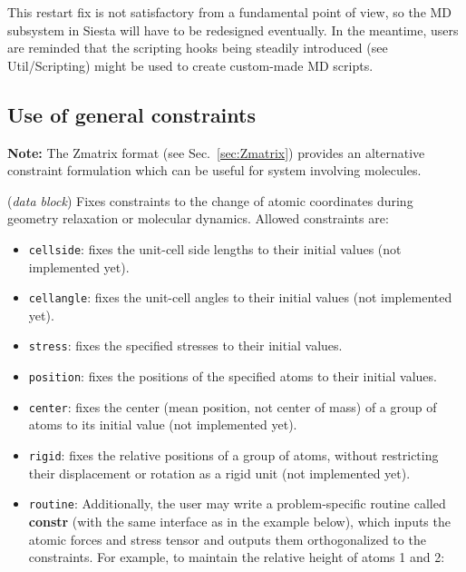 \documentclass[11pt]{article}
\begin{document}
This restart fix is not satisfactory from a fundamental point of view,
so the MD subsystem in Siesta will have to be redesigned
eventually. In the meantime, users are reminded that the scripting
hooks being steadily introduced (see Util/Scripting) might be used to
create custom-made MD scripts.


\subsection{Use of general constraints}

{\bf Note:} The Zmatrix format (see Sec.~\ref{sec:Zmatrix}) provides
an alternative constraint formulation which can be useful for system
involving molecules.

\begin{description}
\itemsep 10pt
\parsep 0pt

\item[{\bf GeometryConstraints}] ({\it data block})
Fixes constraints to the change of atomic coordinates during
geometry relaxation or molecular dynamics. Allowed constraints are:
\begin{itemize}
\item {\tt cellside}: fixes the unit-cell side lengths to
their initial values (not implemented yet).
\item {\tt cellangle}: fixes the unit-cell angles to
their initial values (not implemented yet).
\item {\tt stress}: fixes the specified stresses to
their initial values.
\item {\tt position}: fixes the positions of the specified atoms to
their initial values.
\item {\tt center}: fixes the center (mean position, not center of
mass) of a group of atoms to its initial value (not implemented yet).
\item {\tt rigid}: fixes the relative positions of a group of atoms,
without restricting their displacement or rotation as a rigid unit
(not implemented yet).
\item {\tt routine}: Additionally, the user may write a
problem-specific routine called {\bf constr} (with the same
interface as in the example below), which inputs the atomic
forces and stress tensor and outputs them orthogonalized to the
constraints. For example, to maintain the relative height of
atoms 1 and 2:


\end{itemize}
\end{description}
\end{document}

